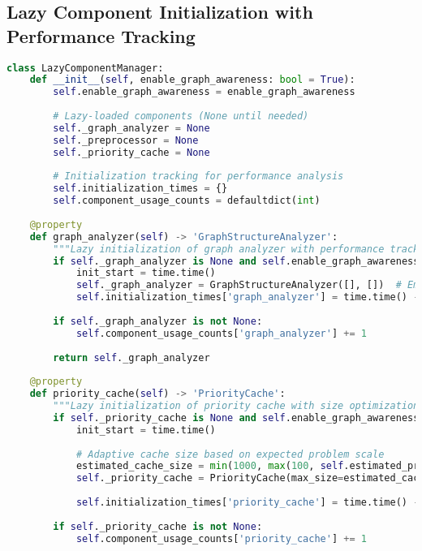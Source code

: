 \subsection{Lazy Component Initialization with Performance Tracking}
\label{appendix:lazy-initialization}

\begin{lstlisting}[language=Python, caption=Lazy Component Initialization with Performance Tracking]
class LazyComponentManager:
    def __init__(self, enable_graph_awareness: bool = True):
        self.enable_graph_awareness = enable_graph_awareness
        
        # Lazy-loaded components (None until needed)
        self._graph_analyzer = None
        self._preprocessor = None
        self._priority_cache = None
        
        # Initialization tracking for performance analysis
        self.initialization_times = {}
        self.component_usage_counts = defaultdict(int)
    
    @property
    def graph_analyzer(self) -> 'GraphStructureAnalyzer':
        """Lazy initialization of graph analyzer with performance tracking"""
        if self._graph_analyzer is None and self.enable_graph_awareness:
            init_start = time.time()
            self._graph_analyzer = GraphStructureAnalyzer([], [])  # Empty initialization
            self.initialization_times['graph_analyzer'] = time.time() - init_start
        
        if self._graph_analyzer is not None:
            self.component_usage_counts['graph_analyzer'] += 1
        
        return self._graph_analyzer
    
    @property 
    def priority_cache(self) -> 'PriorityCache':
        """Lazy initialization of priority cache with size optimization"""
        if self._priority_cache is None and self.enable_graph_awareness:
            init_start = time.time()
            
            # Adaptive cache size based on expected problem scale
            estimated_cache_size = min(1000, max(100, self.estimated_problem_scale * 10))
            self._priority_cache = PriorityCache(max_size=estimated_cache_size)
            
            self.initialization_times['priority_cache'] = time.time() - init_start
        
        if self._priority_cache is not None:
            self.component_usage_counts['priority_cache'] += 1
            

\end{lstlisting}

